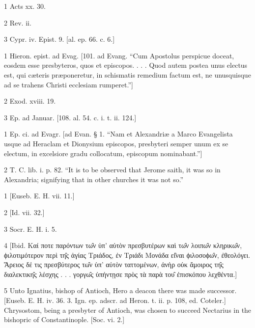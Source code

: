 1
Acts xx. 30.

2
Rev. ii.

3
Cypr. iv. Epist. 9. [al. ep. 66. c. 6.]

1
Hieron. epist. ad Evag. [101. ad Evang. “Cum Apostolus perspicue doceat, eosdem esse presbyteros, quos et episcopos. . . . Quod autem postea unus electus est, qui cæteris præponeretur, in schismatis remedium factum est, ne unusquisque ad se trahens Christi ecclesiam rumperet.”]

2
Exod. xviii. 19.

3
Ep. ad Januar. [108. al. 54. c. i. t. ii. 124.]

1
Ep. ci. ad Evagr. [ad Evan. § 1. “Nam et Alexandriæ a Marco Evangelista usque ad Heraclam et Dionysium episcopos, presbyteri semper unum ex se electum, in excelsiore gradu collocatum, episcopum nominabant.”]

2
T. C. lib. i. p. 82. “It is to be observed that Jerome saith, it was so in Alexandria; signifying that in other churches it was not so.”

1
[Euseb. E. H. vii. 11.]

2
[Id. vii. 32.]

3
Socr. E. H. i. 5.

4
[Ibid. Καί ποτε παρόντων τω̑ν ὑπ’ αὐτὸν πρεσβυτέρων καὶ τω̑ν λοιπω̑ν κληρικω̑ν, ϕιλοτιμότερον περὶ τη̑ς ἁγίας Τριάδος, ἐν Τριάδι Μονάδα εἰ̑ναι ϕιλοσοϕω̑ν, ἐθεολόγει. Ἄρειος δέ τις πρεσβύτερος τω̑ν ὑπ’ αὐτὸν ταττομένων, ἀνὴρ οὐκ ἄμοιρος τη̑ς διαλεκτικη̑ς λέσχης . . . γοργω̑ς ὑπήντῃσε πρὸς τὰ παρὰ του̑ ἐπισκόπου λεχθέντα.]

5
Unto Ignatius, bishop of Antioch, Hero a deacon there was made successor. [Euseb. E. H. iv. 36. 3. Ign. ep. adscr. ad Heron. t. ii. p. 108, ed. Coteler.] Chrysostom, being a presbyter of Antioch, was chosen to succeed Nectarius in the bishopric of Constantinople. [Soc. vi. 2.]

